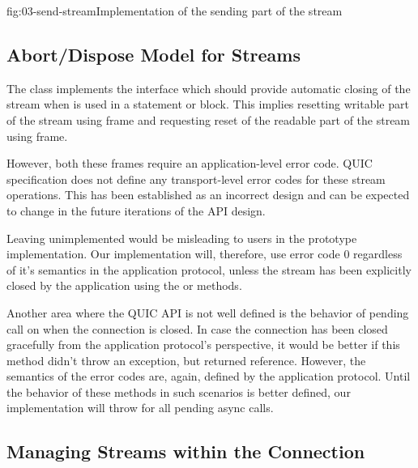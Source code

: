 
\begin{myFigure}{fig:03-send-stream}{Implementation of the sending part of the stream}

  \resizebox{\linewidth}{!}{}

\end{myFigure}


\subsection{Abort/Dispose Model for Streams}

The \QuicStream{} class implements the  interface which should provide
automatic closing of the stream when \QuicStream{} is used in a  statement or
 block. This implies resetting writable part of the stream using \RESETSTREAM{} frame
and requesting reset of the readable part of the stream using \STOPSENDING{} frame.

However, both these frames require an application-level error code. QUIC specification does not
define any transport-level error codes for these stream operations. This has been established as an
incorrect design and can be expected to change in the future iterations of the API design.

Leaving  unimplemented would be misleading to users in the prototype
implementation. Our implementation will, therefore, use error code 0 regardless of it's semantics in
the application protocol, unless the stream has been explicitly closed by the application using the
 or  methods.

Another area where the QUIC API is not well defined is the behavior of pending 
call on \QuicConnection{} when the connection is closed. In case the connection has been closed
gracefully from the application protocol's perspective, it would be better if this method didn't
throw an exception, but returned  reference. However, the semantics of the error codes
are, again, defined by the application protocol. Until the behavior of these methods in such
scenarios is better defined, our implementation will throw
 for all pending async calls.

\subsection{Managing Streams within the Connection}

